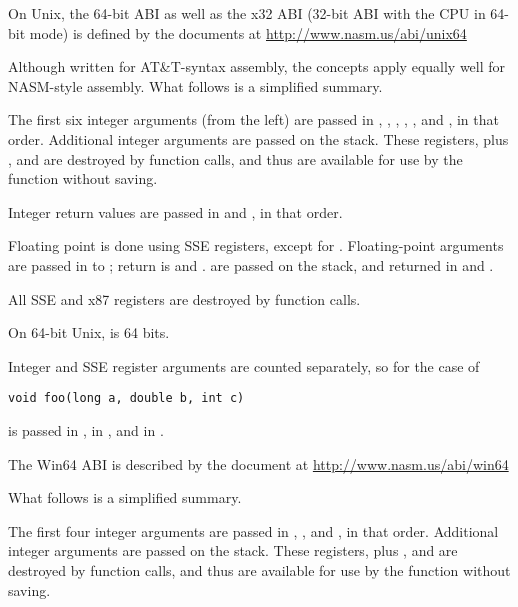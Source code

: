 
On Unix, the 64-bit ABI as well as the x32 ABI (32-bit ABI with the
CPU in 64-bit mode) is defined by the documents at
\href{http://www.nasm.us/abi/unix64}{http://www.nasm.us/abi/unix64}

Although written for AT\&T-syntax assembly, the concepts apply equally
well for NASM-style assembly. What follows is a simplified summary.

The first six integer arguments (from the left) are passed in ,
, , , , and , in that
order. Additional integer arguments are passed on the stack. These
registers, plus ,  and  are destroyed
by function calls, and thus are available for use by the function
without saving.

Integer return values are passed in  and ,
in that order.

Floating point is done using SSE registers, except for .
Floating-point arguments are passed in  to ;
return is  and .  are passed
on the stack, and returned in  and .

All SSE and x87 registers are destroyed by function calls.

On 64-bit Unix,  is 64 bits.

Integer and SSE register arguments are counted separately, so
for the case of

\begin{lstlisting}
void foo(long a, double b, int c)
\end{lstlisting}

 is passed in ,  in ,
and  in .


The Win64 ABI is described by the document at
\href{http://www.nasm.us/abi/win64}{http://www.nasm.us/abi/win64}

What follows is a simplified summary.

The first four integer arguments are passed in , ,
 and , in that order. Additional integer arguments are
passed on the stack. These registers, plus ,  and
 are destroyed by function calls, and thus are available for
use by the function without saving.

